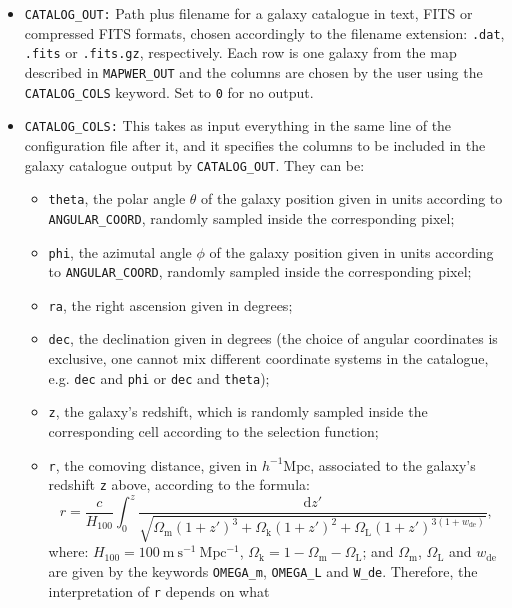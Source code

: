 \documentclass[12pt]{book} %
\begin{document}
\begin{itemize}
\item {\tt CATALOG\_OUT:} Path plus filename for a galaxy catalogue in text, FITS or compressed
  FITS formats, chosen accordingly to the filename extension: {\tt .dat}, {\tt .fits} or {\tt .fits.gz}, 
  respectively. Each row is one galaxy from the map described in {\tt MAPWER\_OUT} and 
  the columns are chosen by the user using the {\tt CATALOG\_COLS} keyword. Set to {\tt 0} for no output.

\item {\tt CATALOG\_COLS:} This takes as input everything in the same line of the configuration 
  file after it, and it specifies the columns to be included in the galaxy catalogue output by 
  {\tt CATALOG\_OUT}. They can be: 
  \begin{itemize}
  \item {\tt theta}, the polar angle $\theta$ of the galaxy position given in units according to 
    {\tt ANGULAR\_COORD}, randomly sampled inside the corresponding pixel; 
  \item {\tt phi}, the azimutal angle $\phi$ of the galaxy position given in units according to 
    {\tt ANGULAR\_COORD}, randomly sampled inside the corresponding pixel;
  \item {\tt ra}, the right ascension given in degrees;
  \item {\tt dec}, the declination given in degrees (the choice of angular coordinates is exclusive, 
    one cannot mix different coordinate systems in the catalogue, e.g. {\tt dec} and {\tt phi} or 
    {\tt dec} and {\tt theta});
  \item {\tt z}, the galaxy's redshift, which is randomly sampled inside the corresponding cell 
    according to the selection function;
  \item {\tt r}, the comoving distance, given in $h^{-1}\mathrm{Mpc}$, associated to 
    the galaxy's redshift {\tt z} above, according to the formula:
    \begin{equation}
      r = \frac{c}{H_{100}}
      \int_0^z\frac{\mathrm{d}z'}{\sqrt{\Omega_{\mathrm{m}}(1+z')^3+\Omega_{\mathrm{k}}(1+z')^2+\Omega_{\mathrm{L}}(1+z')^{3(1+w_{\mathrm{de}})}}}, 
      \label{eq:comdist}
    \end{equation}
    where: $H_{100}=100\mathrm{\:m\:s^{-1}\:Mpc^{-1}}$, $\Omega_{\mathrm{k}}=1-\Omega_{\mathrm{m}}-\Omega_{\mathrm{L}}$; and 
    $\Omega_{\mathrm{m}}$, $\Omega_{\mathrm{L}}$ and $w_{\mathrm{de}}$ are given by the keywords 
    {\tt OMEGA\_m}, {\tt OMEGA\_L} and {\tt W\_de}. Therefore, the interpretation of {\tt r} depends on what 

\end{itemize}
\end{itemize}
\end{document}
